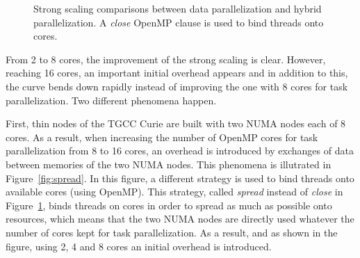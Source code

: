 \begin{figure}[!h]\begin{center}
  \caption{Strong scaling comparisons between data parallelization and hybrid parallelization. A \emph{close} OpenMP clause is used to bind threads onto cores.}
  \label{fig:close}
\end{center}\end{figure}

From 2 to 8 cores, the improvement of the strong scaling is clear. However, reaching 16 cores, an important initial overhead appears and in addition to this, the curve bends down rapidly instead of improving the one with 8 cores for task parallelization. Two different phenomena happen.

First, thin nodes of the TGCC Curie are built with two NUMA nodes each of 8 cores. As a result, when increasing the number of OpenMP cores for task parallelization from 8 to 16 cores, an overhead is introduced by exchanges of data between memories of the two NUMA nodes. This phenomena is illutrated in Figure~\ref{fig:spread}. In this figure, a different strategy is used to bind threads onto available cores (using OpenMP). This strategy, called \emph{spread} instead of \emph{close} in Figure~\ref{fig:close}, binds threads on cores in order to spread as much as possible onto resources, which means that the two NUMA nodes are directly used whatever the number of cores kept for task parallelization. As a result, and as shown in the figure, using 2, 4 and 8 cores an initial overhead is introduced.

